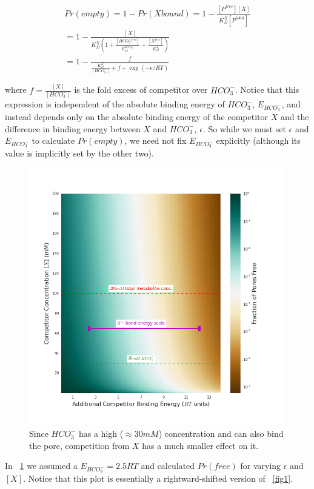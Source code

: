 \documentclass[10pt,a4paper]{article}
\begin{document}
\begin{align}
Pr(empty) = 1 - Pr(X bound) = 1 - \frac{[P^{free}][X]}{K_D^X [P^{total}]} \\
= 1 - \frac{[X]}{K_D^X \left( 1 + \frac{[HCO_3^{-free}]}{K_D^{HCO_3^-}} + \frac{[X^{free}]}{K_D^{X}}\right)} \\
= 1 - \frac{f}{\frac{K_D^X}{[HCO_3^-]} + f + \exp\left(-\epsilon / RT\right)}
\end{align}

where $f = \frac{[X]}{[HCO_3^-]}$ is the fold excess of competitor over $HCO_3^-$. Notice that this expression is independent of the absolute binding energy of $HCO_3^-$, $E_{HCO_3^-}$, and instead depends only on the absolute binding energy of the competitor $X$ and the difference in binding energy between $X$ and $HCO_3^-$, $\epsilon$. So while we must set $\epsilon$ and $E_{HCO_3^-}$ to calculate $Pr(empty)$, we need not fix $E_{HCO_3^-}$ explicitly (although its value is implicitly set by the other two). 

\begin{figure}[ht]
\centering
\includegraphics[scale=0.6]{figures/bicarbonate_competition.png} 
\caption{Since $HCO_3^-$ has a high ($\approx 30 mM$) concentration and can also bind the pore, competition from $X$ has a much smaller effect on it.}
\label{fig2}
\end{figure}

In ~\ref{fig2} we assumed a $E_{HCO_3^-} = 2.5 RT$ and calculated $Pr(free)$ for varying $\epsilon$ and $[X]$. Notice that this plot is essentially a rightward-shifted version of ~\ref{fig1}. 
\end{document}
